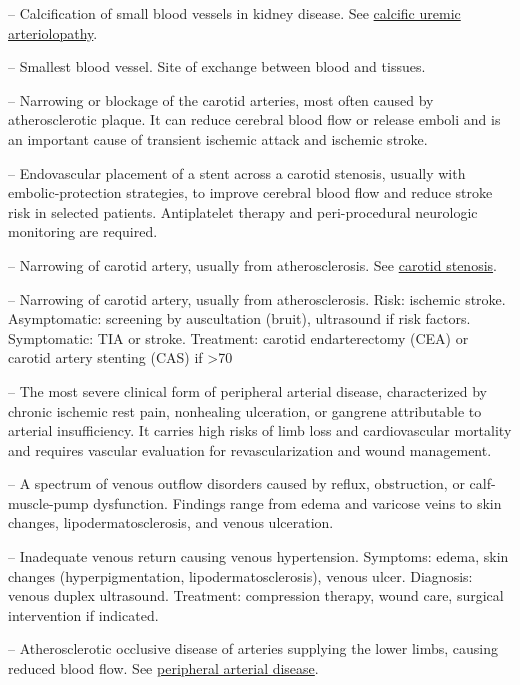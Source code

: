 -- Calcification of small blood vessels in kidney disease. See \hyperlink{Calcific Uremic Arteriolopathy}{calcific uremic arteriolopathy}.

-- Smallest blood vessel. Site of exchange between blood and tissues.

-- Narrowing or blockage of the carotid arteries, most often caused by atherosclerotic plaque. It can reduce cerebral blood flow or release emboli and is an important cause of transient ischemic attack and ischemic stroke.

-- Endovascular placement of a stent across a carotid stenosis, usually with embolic-protection strategies, to improve cerebral blood flow and reduce stroke risk in selected patients. Antiplatelet therapy and peri-procedural neurologic monitoring are required.

-- Narrowing of carotid artery, usually from atherosclerosis. See \hyperlink{Carotid Stenosis}{carotid stenosis}.

-- Narrowing of carotid artery, usually from atherosclerosis. Risk: ischemic stroke. Asymptomatic: screening by auscultation (bruit), ultrasound if risk factors. Symptomatic: TIA or stroke. Treatment: carotid endarterectomy (CEA) or carotid artery stenting (CAS) if >70%

-- The most severe clinical form of peripheral arterial disease, characterized by chronic ischemic rest pain, nonhealing ulceration, or gangrene attributable to arterial insufficiency. It carries high risks of limb loss and cardiovascular mortality and requires vascular evaluation for revascularization and wound management.

-- A spectrum of venous outflow disorders caused by reflux, obstruction, or calf-muscle-pump dysfunction. Findings range from edema and varicose veins to skin changes, lipodermatosclerosis, and venous ulceration.

-- Inadequate venous return causing venous hypertension. Symptoms: edema, skin changes (hyperpigmentation, lipodermatosclerosis), venous ulcer. Diagnosis: venous duplex ultrasound. Treatment: compression therapy, wound care, surgical intervention if indicated.

-- Atherosclerotic occlusive disease of arteries supplying the lower limbs, causing reduced blood flow. See \hyperlink{Peripheral Arterial Disease}{peripheral arterial disease}.


